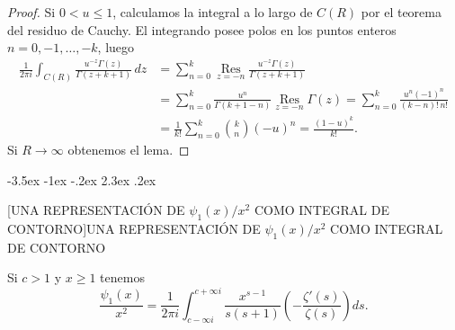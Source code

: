 \documentclass[12pt,a4paper]{book}
\makeatletter
\renewcommand\section{\@startsection{section}{1}{\z@}%
  {-3.5ex \@plus -1ex \@minus -.2ex}%
  {2.3ex \@plus .2ex}%
  {\normalfont\Large\bfseries\raggedright}}
\makeatother
\begin{document}
\begin{proof}
        Si $0<u\leq1$, calculamos la integral a lo largo de $C(R)$ por el teorema del residuo
        de Cauchy. El integrando posee polos en los puntos enteros $n=0,-1,\dots,-k$, luego
        \begin{align*}
            \frac{1}{2\pi i}\int_{C(R)}\frac{u^{-z}\Gamma(z)}{\Gamma(z+k+1)}\,dz&=\sum_{n=0}^{k}\operatorname*{Res}_{z=-n}\frac{u^{-z}\Gamma(z)}{\Gamma(z+k+1)}\\
            &=\sum_{n=0}^{k}\frac{u^{n}}{\Gamma(k+1-n)}\operatorname*{Res}_{z=-n}\Gamma(z)=\sum_{n=0}^{k}\frac{u^{n}(-1)^{n}}{(k-n)!\,n!}\\
            &=\frac{1}{k!}\sum_{n=0}^{k}\binom{k}{n}(-u)^{n}=\frac{(1-u)^{k}}{k!}.
        \end{align*}
        Si $R\to\infty$ obtenemos el lema.
    \end{proof}

    \section[UNA REPRESENTACIÓN DE \texorpdfstring{$\psi_{1}(x)/x^{2}$}{ψ₁(x)/x²} COMO INTEGRAL DE CONTORNO]{UNA REPRESENTACIÓN DE \texorpdfstring{$\psi_{1}(x)/x^{2}$}{ψ₁(x)/x²} COMO INTEGRAL DE CONTORNO}

    \begin{teorema}\label{teo:13-2}
        Si $c>1$ y $x\geq1$ tenemos
        \begin{equation}\label{eq:13-11}
            \frac{\psi_{1}(x)}{x^{2}}=\frac{1}{2\pi i}\int_{c-\infty i}^{c+\infty i}\frac{x^{s-1}}{s(s+1)}\left(-\frac{\zeta'(s)}{\zeta(s)}\right)ds.
        \end{equation}
    \end{teorema}
\end{document}
